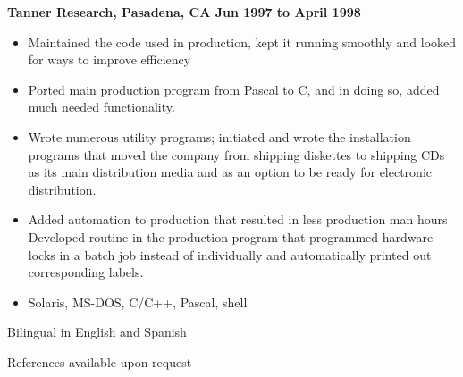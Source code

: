 \documentclass{res}
\begin{document}
\begin{resume}
{\large \bf Tanner Research, Pasadena, CA \hfill Jun 1997 to April 1998}
\begin{itemize}
\item Maintained the code used in production, kept it running
smoothly and looked for ways to improve efficiency
\item Ported main production program from Pascal to C, and in doing
so, added much needed functionality.
\item Wrote numerous utility programs; initiated and wrote the
installation programs that moved the company from shipping diskettes
to shipping CDs as its main distribution media and as an option to
be ready for electronic distribution.
\item Added automation to production that resulted in less production
man hours Developed routine in the production program that programmed
hardware locks in a batch job instead of individually and automatically
printed out corresponding labels.
\item  Solaris, MS-DOS, C/C++, Pascal, shell
\end{itemize}

Bilingual in English and Spanish

References available upon request

\end{resume}
\end{document}

